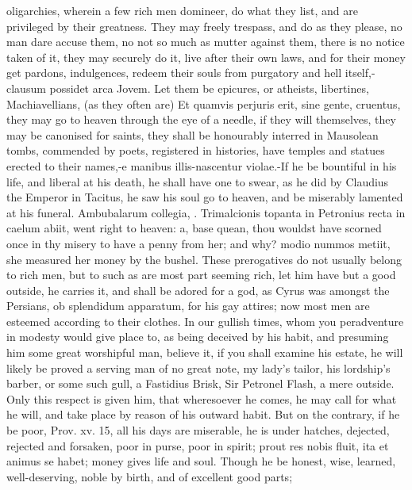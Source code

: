 {oligarchies, wherein a few rich men domineer, do what they list, and
are privileged by their greatness. They may freely trespass, and
do as they please, no man dare accuse them, no not so much as mutter
against them, there is no notice taken of it, they may securely do it,
live after their own laws, and for their money get pardons,
indulgences, redeem their souls from purgatory and hell itself,-clausum
possidet arca Jovem. Let them be epicures, or atheists, libertines,
Machiavellians, (as they often are) Et quamvis perjuris erit,
sine gente, cruentus, they may go to heaven through the eye of a
needle, if they will themselves, they may be canonised for saints, they
shall be honourably interred in Mausolean tombs, commended by
poets, registered in histories, have temples and statues erected to
their names,-e manibus illis-nascentur violae.-If he be bountiful in
his life, and liberal at his death, he shall have one to swear, as he
did by Claudius the Emperor in Tacitus, he saw his soul go to heaven,
and be miserably lamented at his funeral. Ambubalarum collegia, \etc{}.
Trimalcionis topanta in Petronius recta in caelum abiit, went right to
heaven: a, base quean, thou wouldst have scorned once in thy
misery to have a penny from her; and why? modio nummos metiit, she
measured her money by the bushel. These prerogatives do not usually
belong to rich men, but to such as are most part seeming rich, let him
have but a good outside, he carries it, and shall be adored for a
god, as Cyrus was amongst the Persians, ob splendidum apparatum,
for his gay attires; now most men are esteemed according to their
clothes. In our gullish times, whom you peradventure in modesty would
give place to, as being deceived by his habit, and presuming him some
great worshipful man, believe it, if you shall examine his estate, he
will likely be proved a serving man of no great note, my lady's tailor,
his lordship's barber, or some such gull, a Fastidius Brisk, Sir
Petronel Flash, a mere outside. Only this respect is given him, that
wheresoever he comes, he may call for what he will, and take place by
reason of his outward habit.
But on the contrary, if he be poor, Prov. xv. 15, all his days are
miserable, he is under hatches, dejected, rejected and forsaken, poor
in purse, poor in spirit; prout res nobis fluit, ita et animus se
habet; money gives life and soul. Though he be honest, wise,
learned, well-deserving, noble by birth, and of excellent good parts;
}
